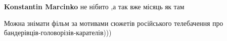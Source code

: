 \begin{itemize}
\begin{itemize}
\textbf{Konstantin Marcinko} не нібито ,а так вже місяць як там
\end{itemize}

 

Можна знімати фільм за мотивами сюжетів російського телебачення про
бандерівців-головорізів-карателів)))


\end{itemize}

